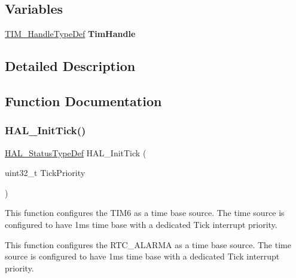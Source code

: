 \subsection*{Variables}
\begin{DoxyCompactItemize}
\item 
\mbox{\label{group___h_a_l___time_base___t_i_m_gaad0e79d89de05e8451c9b6ac5d88109d}} 
\hyperlink{struct_t_i_m___handle_type_def}{T\+I\+M\+\_\+\+Handle\+Type\+Def} {\bfseries Tim\+Handle}
\end{DoxyCompactItemize}


\subsection{Detailed Description}


\subsection{Function Documentation}
\mbox{\label{group___h_a_l___time_base___t_i_m_ga879cdb21ef051eb81ec51c18147397d5}} 
\subsubsection{\texorpdfstring{H\+A\+L\+\_\+\+Init\+Tick()}{HAL\_InitTick()}}
{\footnotesize\ttfamily \hyperlink{stm32f0xx__hal__def_8h_a63c0679d1cb8b8c684fbb0632743478f}{H\+A\+L\+\_\+\+Status\+Type\+Def} H\+A\+L\+\_\+\+Init\+Tick (\begin{DoxyParamCaption}\item[{uint32\+\_\+t}]{Tick\+Priority }\end{DoxyParamCaption})}



This function configures the T\+I\+M6 as a time base source. The time source is configured to have 1ms time base with a dedicated Tick interrupt priority. 

This function configures the R\+T\+C\+\_\+\+A\+L\+A\+R\+MA as a time base source. The time source is configured to have 1ms time base with a dedicated Tick interrupt priority.

